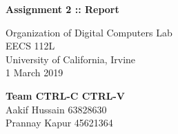 \documentclass{article}
\begin{document}
\begin{titlepage}
	\begin{center}
		\vspace*{1cm}
 
		\Huge
		\textbf{Assignment 2 :: Report}
 
		\vspace{0.5cm}
		\Large
		
 
		\vspace{1.5cm}
		Organization of  Digital Computers Lab\\
		EECS 112L\\
		University of California, Irvine\\
		1 March 2019
 
		\vfill

 
		\vspace{0.8cm}
		\Large 
	          	\textbf{	Team CTRL-C CTRL-V } \\
				Aakif Hussain   63828630 \\
				Prannay Kapur  45621364
 
 
	\end{center}
\end{titlepage}
	\Large
\end{document}

